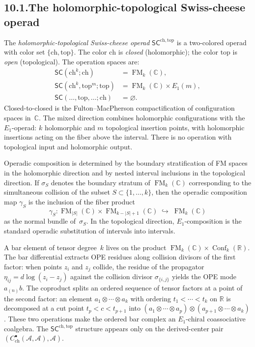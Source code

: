 \documentclass[11pt]{report}
\theoremstyle{definition}
\theoremstyle{remark}
\providecommand{\cA}{\mathcal{A}}
\numberwithin{equation}{section}
\begin{document}
\subsection*{10.1.\enspace The holomorphic-topological Swiss-cheese operad}

The \emph{holomorphic-topological Swiss-cheese operad}
$\mathsf{SC}^{\mathrm{ch,top}}$ is a two-colored operad with color
set $\{\mathrm{ch},\mathrm{top}\}$. The color $\mathrm{ch}$ is
\emph{closed} (holomorphic); the color $\mathrm{top}$ is
\emph{open} (topological). The operation spaces are:
\begin{align*}
\mathsf{SC}(\mathrm{ch}^k;\mathrm{ch})
&=\operatorname{FM}_k(\mathbb C),\\
\mathsf{SC}(\mathrm{ch}^k,\mathrm{top}^m;\mathrm{top})
&=\operatorname{FM}_k(\mathbb C)\times E_1(m),\\
\mathsf{SC}(\ldots,\mathrm{top},\ldots;\mathrm{ch})
&=\varnothing.
\end{align*}
Closed-to-closed is the Fulton--MacPherson
compactification of configuration spaces in~$\mathbb C$.
The mixed direction combines holomorphic
configurations with the $E_1$-operad: $k$
holomorphic and $m$ topological insertion points,
with holomorphic insertions acting on the fiber above the interval.
There is no operation with topological input and holomorphic output.

Operadic composition is determined by the boundary stratification of
FM spaces in the holomorphic direction and by nested interval
inclusions in the topological direction. If $\sigma_S$ denotes
the boundary stratum of $\operatorname{FM}_k(\mathbb C)$
corresponding to the simultaneous collision of the subset
$S\subset\{1,\ldots,k\}$, then the operadic composition map
$\gamma_{S}$ is the inclusion of the fiber product
\[
\gamma_S\colon
\operatorname{FM}_{|S|}(\mathbb C)\times\operatorname{FM}_{k-|S|+1}(\mathbb C)
\;\hookrightarrow\;
\operatorname{FM}_k(\mathbb C)
\]
as the normal bundle of~$\sigma_S$. In the topological direction,
$E_1$-composition is the standard operadic substitution of intervals
into intervals.

A bar element of tensor degree~$k$ lives on the product
$\operatorname{FM}_k(\mathbb C)\times\operatorname{Conf}_k(\mathbb R)$.
The bar differential extracts OPE residues along collision divisors
of the first factor: when points $z_i$ and $z_j$ collide, the
residue of the propagator $\eta_{ij}=d\log(z_i-z_j)$ against the
collision divisor $\sigma_{\{i,j\}}$ yields the OPE mode
$a_{(n)}b$. The coproduct splits an ordered sequence of tensor
factors at a point of the second factor: an element
$a_1\otimes\cdots\otimes a_k$ with ordering
$t_1<\cdots<t_k$ on $\mathbb R$ is decomposed at a cut point
$t_p<c<t_{p+1}$ into
$(a_1\otimes\cdots\otimes a_p)\otimes(a_{p+1}\otimes\cdots\otimes a_k)$.
These two operations make the ordered bar complex an
$E_1$-chiral coassociative coalgebra. The
$\mathsf{SC}^{\mathrm{ch,top}}$ structure appears only on the
derived-center pair
$(C^\bullet_{\mathrm{ch}}(\cA,\cA), \cA)$.
\end{document}

